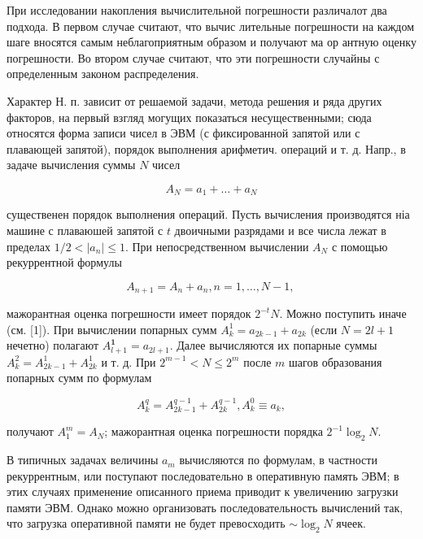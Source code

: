 \documentclass[10pt]{article}
\begin{document}
При исследовании накопления вычислительной погрешности различалот два подхода. В первом случае считают, что вычис лительные погрешности на каждом шаге вносятся самым неблагоприятным образом и получают ма ор антную оценку погрешности. Во втором случае считают, что эти погрешности случайны с определенным законом распределения.



Характер Н. п. зависит от решаемой задачи, метода решения и ряда других факторов, на первый взгляд могущих показаться несущественными; сюда относятся форма записи чисел в ЭВМ (с фиксированной запятой или с плавающей запятой), порядок выполнения арифметич. операций и т. д. Напр., в задаче вычисления суммы $N$ чисел



\[

A_{N}=a_{1}+\ldots+a_{N}

\]



существенен порядок выполнения операций. Пусть вычисления производятся ніа машине с плаваюшей запятой с $t$ двоичными разрядами и все числа лежат в пределах $1 / 2<\left|a_{n}\right| \leqslant 1$. При непосредственном вычислении $A_{N}$ с помощью рекуррентной формулы



\[

A_{n+1}=A_{n}+a_{n}, n=1, \ldots, N-1 \text {, }

\]



мажорантная оценка погрешности имеет порядок $2^{-t} N$. Можно поступить иначе (см. [1]). При вычислении попарных сумм $A_{k}^{1}=a_{2 k-1}+a_{2 k}$ (если $N=2 l+1$ нечетно) полагают $A_{l+1}^{\mathbf{1}}=a_{2 l+1}$. Далее вычисляются их попарные суммы $A_{k}^{2}=A_{2 k-1}^{1}+A_{2 k}^{1}$ и т. д. При $2^{m-1}<N \leqslant 2^{m}$ после $m$ шагов образования попарных сумм по формулам



\[

A_{k}^{q}=A_{2 k-1}^{q-1}+A_{2 k}^{q-1}, A_{k}^{0} \equiv a_{k},

\]



получают $A_{1}^{m}=A_{N}$; мажорантная оценка погрешности порядка $2^{-1} \log _{2} N$.



В типичных задачах величины $a_{m}$ вычисляются по формулам, в частности рекуррентным, или поступают последовательно в оперативную память ЭВМ; в этих случаях применение описанного приема приводит к увеличению загрузки памяти ЭВМ. Однако можно организовать последовательность вычислений так, что загрузка оперативной памяти не будет превосходить $\sim \log _{2} N$ ячеек.
\end{document}
